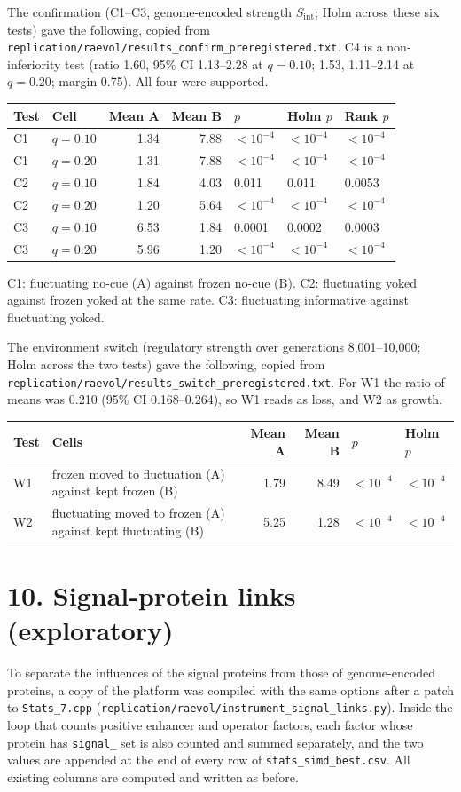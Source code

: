 The confirmation (C1--C3, genome-encoded strength $S_\mathrm{int}$; Holm across
these six tests) gave the following, copied from
\texttt{replication/raevol/results\_confirm\_preregistered.txt}. C4 is a
non-inferiority test (ratio 1.60, 95\% CI 1.13--2.28 at $q=0.10$; 1.53, 1.11--2.14
at $q=0.20$; margin 0.75). All four were supported.
\begin{center}
\small
\begin{tabular}{@{}llrrlll@{}}
\toprule
Test & Cell & Mean A & Mean B & $p$ & Holm $p$ & Rank $p$\\
\midrule
C1 & $q=0.10$ & 1.34 & 7.88 & $<10^{-4}$ & $<10^{-4}$ & $<10^{-4}$\\
C1 & $q=0.20$ & 1.31 & 7.88 & $<10^{-4}$ & $<10^{-4}$ & $<10^{-4}$\\
C2 & $q=0.10$ & 1.84 & 4.03 & 0.011 & 0.011 & 0.0053\\
C2 & $q=0.20$ & 1.20 & 5.64 & $<10^{-4}$ & $<10^{-4}$ & $<10^{-4}$\\
C3 & $q=0.10$ & 6.53 & 1.84 & 0.0001 & 0.0002 & 0.0003\\
C3 & $q=0.20$ & 5.96 & 1.20 & $<10^{-4}$ & $<10^{-4}$ & $<10^{-4}$\\
\bottomrule
\end{tabular}
\end{center}
C1: fluctuating no-cue (A) against frozen no-cue (B). C2: fluctuating yoked
against frozen yoked at the same rate. C3: fluctuating informative against
fluctuating yoked.

The environment switch (regulatory strength over generations 8{,}001--10{,}000;
Holm across the two tests) gave the following, copied from
\texttt{replication/raevol/results\_switch\_preregistered.txt}. For W1 the
ratio of means was 0.210 (95\% CI 0.168--0.264), so W1 reads as loss, and W2 as
growth.
\begin{center}
\small
\begin{tabular}{@{}llrrll@{}}
\toprule
Test & Cells & Mean A & Mean B & $p$ & Holm $p$\\
\midrule
W1 & frozen moved to fluctuation (A) against kept frozen (B) & 1.79 & 8.49 & $<10^{-4}$ & $<10^{-4}$\\
W2 & fluctuating moved to frozen (A) against kept fluctuating (B) & 5.25 & 1.28 & $<10^{-4}$ & $<10^{-4}$\\
\bottomrule
\end{tabular}
\end{center}

\section*{10. Signal-protein links (exploratory)}
To separate the influences of the signal proteins from those of genome-encoded
proteins, a copy of the platform was compiled with the same options after a patch
to \texttt{Stats\_7.cpp}
(\texttt{replication/raevol/instrument\_signal\_links.py}). Inside the loop that
counts positive enhancer and operator factors, each factor whose protein has
\texttt{signal\_} set is also counted and summed separately, and the two values
are appended at the end of every row of \texttt{stats\_simd\_best.csv}. All
existing columns are computed and written as before.

